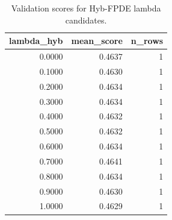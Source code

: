 \begin{table}[t]
\caption{Validation scores for Hyb-FPDE lambda candidates.}
\label{tab:lambda_distribution_computed}
\centering
\begin{tabular}{rrr}
\toprule
lambda\_hyb & mean\_score & n\_rows \\
\midrule
0.0000 & 0.4637 & 1 \\
0.1000 & 0.4630 & 1 \\
0.2000 & 0.4634 & 1 \\
0.3000 & 0.4634 & 1 \\
0.4000 & 0.4632 & 1 \\
0.5000 & 0.4632 & 1 \\
0.6000 & 0.4634 & 1 \\
0.7000 & 0.4641 & 1 \\
0.8000 & 0.4634 & 1 \\
0.9000 & 0.4630 & 1 \\
1.0000 & 0.4629 & 1 \\
\bottomrule
\end{tabular}

\end{table}
